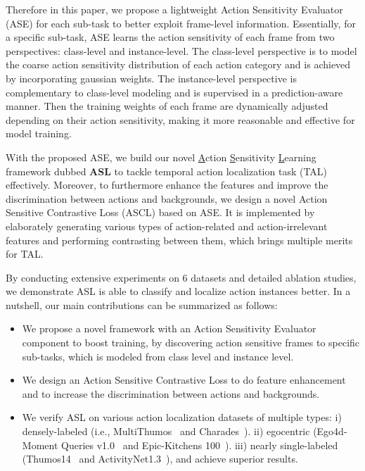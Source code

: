 \documentclass[10pt,twocolumn,letterpaper]{article}
\begin{document}
\par Therefore in this paper, we propose a lightweight Action Sensitivity Evaluator (ASE) for each sub-task to better exploit frame-level information. Essentially, for a specific sub-task, ASE learns the action sensitivity of each frame from two perspectives: class-level and instance-level. The class-level perspective is to model the coarse action sensitivity distribution of each action category and is achieved by incorporating gaussian weights. The instance-level perspective is complementary to class-level modeling and is supervised in a prediction-aware manner. Then the training weights of each frame are dynamically adjusted depending on their action sensitivity, making it more reasonable and effective for model training.
\par With the proposed ASE, we build our novel \underline{A}ction \underline{S}ensitivity \underline{L}earning framework dubbed \textbf{ASL} to tackle temporal action localization task (TAL) effectively.  Moreover, to furthermore enhance the features and improve the discrimination between actions and backgrounds, we design a novel Action Sensitive Contrastive Loss (ASCL) based on ASE. It is implemented by elaborately generating various types of action-related and action-irrelevant features and performing contrasting between them, which brings multiple merits for TAL.
\par By conducting extensive experiments on 6 datasets and detailed ablation studies, we demonstrate ASL is able to classify and localize action instances better. In a nutshell, our main contributions can be summarized as follows:
\begin{itemize}
\item[] We propose a novel framework with an Action Sensitivity Evaluator component to boost training,  by discovering action sensitive frames to specific sub-tasks, which is modeled from class level and instance level.
\vspace{-0.2em}
\item[] We design an Action Sensitive Contrastive Loss to do feature enhancement and to increase the discrimination between actions and backgrounds.
\vspace{-0.2em}
\item[] We verify ASL on various action localization datasets of multiple types: i) densely-labeled (i.e., MultiThumos~\cite{multithumos} and Charades~\cite{charades}). ii) egocentric (Ego4d-Moment Queries v1.0~\cite{grauman2022ego4d} and Epic-Kitchens 100~\cite{Damen2018EPICKITCHENS}). iii) nearly single-labeled (Thumos14~\cite{thumos} and ActivityNet1.3~\cite{caba2015activitynet}), and achieve superior results.
\end{itemize}
\end{document}

